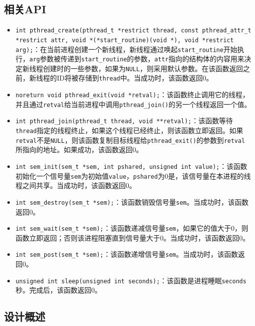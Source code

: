 \documentclass[lang=cn,11pt,a4paper,cite=authornum]{paper}
\begin{document}
\subsection{相关API}

\begin{itemize}
    \item \texttt{int pthread_create(pthread_t *restrict thread, const pthread_attr_t *restrict attr, void *(*start_routine)(void *), void *restrict arg);}：在当前进程创建一个新线程，新线程通过唤起\texttt{start_routine}开始执行，\texttt{arg}参数被传递到\texttt{start_routine}的参数，\texttt{attr}指向的结构体的内容用来决定新线程创建时的一些参数，如果为\texttt{NULL}，则采用默认参数。在该函数返回之前，新线程的ID将被存储到\texttt{thread}中。当成功时，该函数返回0。
    \item \texttt{noreturn void pthread_exit(void *retval);}：该函数终止调用它的线程，并且通过\texttt{retval}给当前进程中调用\texttt{pthread_join()}的另一个线程返回一个值。
    \item \texttt{int pthread_join(pthread_t thread, void **retval);}：该函数等待\texttt{thread}指定的线程终止，如果这个线程已经终止，则该函数立即返回。如果\texttt{retval}不是\texttt{NULL}，则该函数复制目标线程给\texttt{pthread_exit()}的参数到\texttt{retval}所指向的地址。如果成功，该函数返回0。
    \item \texttt{int sem_init(sem_t *sem, int pshared, unsigned int value);}：该函数初始化一个信号量\texttt{sem}为初始值\texttt{value}，\texttt{pshared}为0是，该信号量在本进程的线程之间共享。当成功时，该函数返回0。
    \item \texttt{int sem_destroy(sem_t *sem);}：该函数销毁信号量\texttt{sem}。当成功时，该函数返回0。
    \item \texttt{int sem_wait(sem_t *sem);}：该函数递减信号量\texttt{sem}，如果它的值大于0，则函数立即返回；否则该进程阻塞直到信号量大于0。当成功时，该函数返回0。
    \item \texttt{int sem_post(sem_t *sem);}：该函数递增信号量\texttt{sem}。当成功时，该函数返回0。
    \item \texttt{unsigned int sleep(unsigned int seconds);}：该函数是进程睡眠\texttt{seconds}秒。完成后，该函数返回0。
\end{itemize}

\subsection{设计概述}
\end{document}
